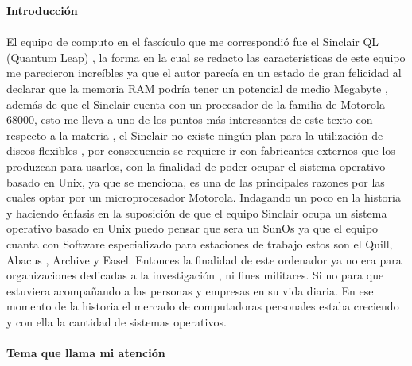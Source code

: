 \documentclass[a4paper, 12pt]{article}
\begin{document}
{\bf Introducci\'on}\\ \\
El equipo de computo en el fasc\'iculo que me correspondi\'o fue el Sinclair QL (Quantum Leap) , la forma en la cual se redacto las caracter\'isticas de este equipo me parecieron incre\'ibles ya que el autor parec\'ia en un estado de gran felicidad al declarar que la memoria RAM podr\'ia tener un potencial de medio Megabyte , adem\'as de que el Sinclair  cuenta con un procesador de la familia de  Motorola 68000, esto me lleva a uno de los puntos m\'as interesantes de este texto con respecto a la materia , el Sinclair no existe ning\'un plan para la utilizaci\'on de discos flexibles , por consecuencia se requiere ir con fabricantes externos que los produzcan para usarlos, con la finalidad de poder ocupar el sistema operativo basado en Unix, ya que se menciona, es una de las principales razones por las cuales optar por un microprocesador Motorola. Indagando un poco en la historia y haciendo \'enfasis en la suposici\'on de que el equipo Sinclair ocupa un sistema operativo basado en Unix puedo pensar que sera un SunOs ya que el equipo cuanta con Software especializado para estaciones de trabajo estos son el Quill, Abacus , Archive y Easel. Entonces la finalidad de este ordenador ya no era para organizaciones dedicadas a la investigaci\'on , ni fines militares. Si no para que estuviera acompa\~nando a las personas y empresas en su vida diaria. En ese momento de la historia el mercado de computadoras personales estaba creciendo y con ella la cantidad de sistemas operativos. 
\\ \\
{\bf Tema que llama mi atenci\'on}
\\ \\
\end{document}
